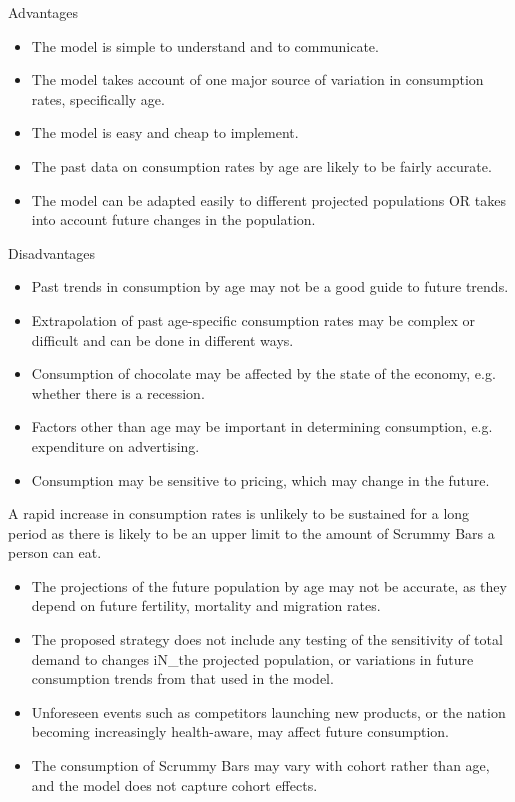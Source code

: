 \documentclass[a4paper,12pt]{article}
\begin{document}
Advantages
\begin{itemize}
\item The model is simple to understand and to communicate.
\item The model takes account of one major source of variation in consumption
rates, specifically age.
\item The model is easy and cheap to implement.
\item The past data on consumption rates by age are likely to be fairly accurate.
\item The model can be adapted easily to different projected populations OR takes
into account future changes in the population.
\end{itemize}
Disadvantages
\begin{itemize}
\item Past trends in consumption by age may not be a good guide to future trends.
\item Extrapolation of past age-specific consumption rates may be complex or
difficult and can be done in different ways.
\item Consumption of chocolate may be affected by the state of the economy,
e.g. whether there is a recession.
\item Factors other than age may be important in determining consumption,
e.g. expenditure on advertising.
\item Consumption may be sensitive to pricing, which may change in the future.
\end{itemize}
A rapid increase in consumption rates is unlikely to be sustained
for a long period as there is likely to be an upper limit to
the amount of Scrummy Bars a person can eat.
\begin{itemize}
\item The projections of the future population by age may not be accurate, as
they depend on future fertility, mortality and migration rates.
\item The proposed strategy does not include any testing of the sensitivity of total demand to changes iN_the projected population, or variations in future consumption trends from that used in the model.
\item Unforeseen events such as competitors launching new products, or the nation becoming increasingly health-aware, may affect future consumption.
\item The consumption of Scrummy Bars may vary with cohort rather than age, and
the model does not capture cohort effects.
\end{itemize}
\end{document}
